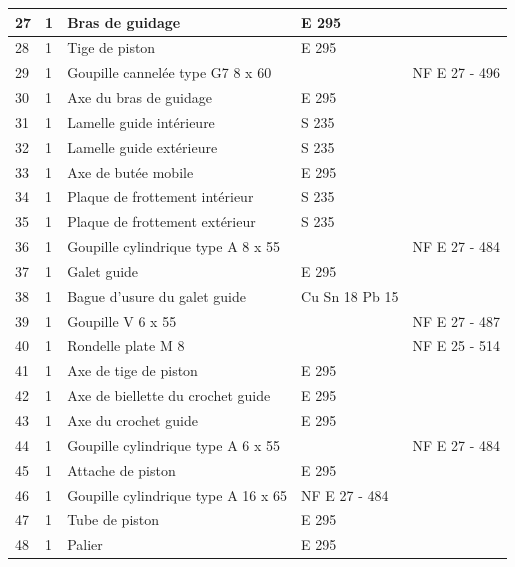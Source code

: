 \documentclass[11pt,oneside]{article}
\begin{document}
\begin{center}
{{\begin{tabular}{|l|l|l|l|l|}
27&	1&	Bras de guidage	&E 295&	\\\hline
28&	1&	Tige de piston	&E 295&	\\\hline
29&	1&	Goupille cannelée type G7 8 x 60&		&NF E 27 - 496\\\hline
30&	1&	Axe du bras de guidage	&E 295&	\\\hline
31&	1&	Lamelle guide intérieure	&S 235&	\\\hline
32&	1&	Lamelle guide extérieure	&S 235&	\\\hline
33&	1&	Axe de butée mobile	&E 295&	\\\hline
34&	1&	Plaque de frottement intérieur	&S 235&	\\\hline
35&	1&	Plaque de frottement extérieur	&S 235&	\\\hline
36&	1&	Goupille cylindrique type A 8 x 55&		&NF E 27 - 484\\\hline
37&	1&	Galet guide	&E 295&	\\\hline
38&	1&	Bague d’usure du galet guide	&Cu Sn 18 Pb 15&	\\\hline
39&	1&	Goupille V 6 x 55	&	&NF E 27 - 487\\\hline
40&	1&	Rondelle plate M 8	&	&NF E 25 - 514\\\hline
41&	1&	Axe de tige de piston	&E 295&	\\\hline
42&	1&	Axe de biellette du crochet guide&	E 295&	\\\hline
43&	1&	Axe du crochet guide	&E 295&	\\\hline
44&	1&	Goupille cylindrique type A 6 x 55&		&NF E 27 - 484\\\hline
45&	1&	Attache de piston	&E 295&\\\hline
46&	1&	Goupille cylindrique type A 16 x 65		&NF E 27 - 484&\\\hline
47&	1&	Tube de piston	&E 295&	\\\hline
48&	1&	Palier	&E 295& \\\hline
\end{tabular}}}
\end{center}
\end{document}
